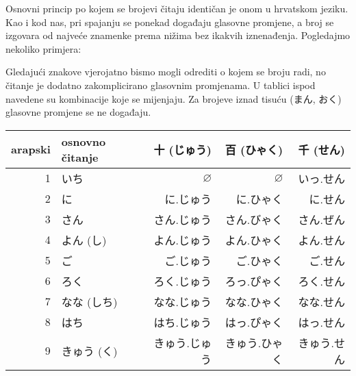	\newpage
	
	Osnovni princip po kojem se brojevi čitaju identičan je onom u hrvatskom jeziku. Kao i kod nas, pri spajanju se ponekad događaju glasovne promjene, a broj se izgovara od najveće znamenke prema nižima bez ikakvih iznenađenja. Pogledajmo nekoliko primjera:
	
	\begin{reibun}
	\end{reibun}

	Gledajući znakove vjerojatno bismo mogli odrediti o kojem se broju radi, no čitanje je dodatno zakomplicirano glasovnim promjenama. U tablici ispod navedene su kombinacije koje se mijenjaju. Za brojeve iznad tisuću (まん, おく) glasovne promjene se ne događaju.
	
	\vspace{5pt}
	\begin{table}[h]
		\centering
		\begin{tabular}{r l r r r}\toprule[2pt]
			arapski & osnovno čitanje & 十 (じゅう) & 百 (ひゃく) & 千 (せん)\\
			\midrule
			1			& いち & $\varnothing$ & $\varnothing$ & \colorbox{blue!10}{いっ.せん} \\
			2			& に & に.じゅう & に.ひゃく & に.せん \\
			3			& さん & さん.じゅう & \colorbox{blue!10}{さん.びゃく} & \colorbox{blue!10}{さん.ぜん} \\
			4			& よん (し\footnotemark[1]) & よん.じゅう & よん.ひゃく & よん.せん \\
			5			& ご & ご.じゅう & ご.ひゃく & ご.せん \\
			6			& ろく & ろく.じゅう & \colorbox{blue!10}{ろっ.ぴゃく} & ろく.せん \\
			7			& なな (しち\footnotemark[1]) & なな.じゅう & なな.ひゃく & なな.せん \\
			8			& はち & はち.じゅう & \colorbox{blue!10}{はっ.ぴゃく} & \colorbox{blue!10}{はっ.せん} \\
			9			& きゅう (く\footnotemark[1]) & きゅう.じゅう & きゅう.ひゃく & きゅう.せん \\
			\bottomrule
		\end{tabular}
	\end{table}


